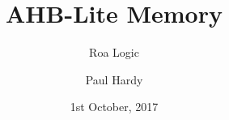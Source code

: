 \usepackage{pkg/roalogictitle}


\title{AHB-Lite Memory}
\author{Roa Logic}
\date{1st October, 2017}
\author{Paul Hardy}

\pagestyle{fancy}
\fancyhf{}
\fancyhead[R]{\thepage}
